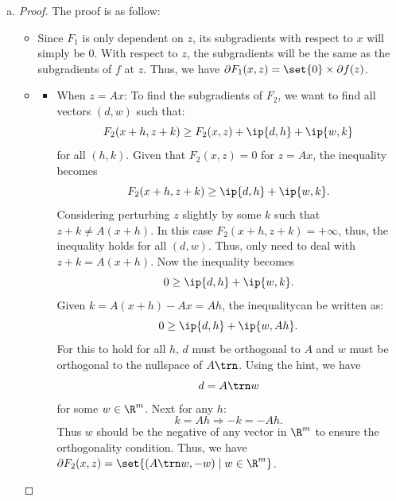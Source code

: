 \documentclass{article}
\theoremstyle{plain}
\theoremstyle{definition}
\theoremstyle{remark}
\begin{document}
\begin{solution}
\begin{enumerate}[(a)]
{\begin{proof}
\begin{itemize}
                    \item \textbf{\( F \) is convex:}
                    \( F \) is the sum of \( F_1 \) and \( F_2 \), and the sum of two convex functions is also convex.

                    \item \textbf{\( d \in \partial g(x) \) implies \( (d, 0) \in \partial F(x, Ax) \):}
                    By the definition of subgradients and function \( g \), we have:
                    \[ g(x+h) \geq g(x) + d^\top h \text{ for all } h \in \mathbb{R}^n. \]
                    Given \( g(x) = f(Ax) \), this can be rewritten as:
                    \[ f(A(x+h)) \geq f(Ax) + d^\top h. \]
                    Considering the definition of \( F \), we can express this inequality as:
                    \[ F(x+h, A(x+h)) \geq F(x, Ax) + d^\top h. \]
                    Given the definition of the subgradients for functions of two variables, this means:
                    \[ (d, 0) \in \partial F(x, Ax) \]
                \end{itemize}
            \end{proof}
        }
        \item {
            \begin{proof}
                The proof is as follow:
                \begin{itemize}
                    \item Since $F_1$ is only dependent on $z$, its subgradients with respect to $x$ will simply be $0$. With respect to $z$, the subgradients will be the same as the subgradients of $f$ at $z$. Thus, we have $\partial F_1(x,z)=\set{0}\times\partial f(z)$.
                    \item {
                        \begin{itemize}
                            \item When $z=Ax$: To find the subgradients of $F_2$, we want to find all vectors $(d,w)$ such that: \[F_2(x+h,z+k)\geq F_2(x,z)+\ip{d,h}+\ip{w,k}\] for all $(h,k)$. Given that $F_2(x,z)=0$ for $z=Ax$, the inequality becomes \[F_2(x+h,z+k)\geq \ip{d,h}+\ip{w,k}.\] Considering perturbing $z$ slightly by some $k$ such that $z+k\neq A(x+h)$. In this case $F_2(x+h,z+k)=+\infty$, thus, the inequality holds for all $(d,w)$. Thus, only need to deal with $z+k = A(x+h)$. Now the inequality becomes \[0\geq \ip{d,h}+\ip{w,k}.\] Given $k=A(x+h)-Ax=Ah$, the inequalitycan be written as: \[0\geq \ip{d,h}+\ip{w,Ah}.\] For this to hold for all $h$, $d$ must be orthogonal to $A$ and $w$ must be orthogonal to the nullspace of $A\trn$. Using the hint, we have \[d=A\trn w\] for some $w\in\R^m$. Next for any $h$: \[k=Ah\Rightarrow -k=-Ah.\] Thus $w$ should be the negative of any vector in $\R^m$ to ensure the orthogonality condition. Thus, we have $\partial F_2(x,z)=\set{(A\trn w,-w)\mid w\in\R^m}$.

\end{itemize}}
\end{itemize}
\end{proof}}
\end{enumerate}
\end{solution}
\end{document}
